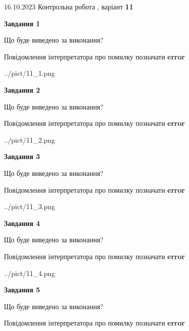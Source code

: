 \documentclass[12pt, ukrainian]{article}
\begin{document}
{\Large{16.10.2023 Контрольна робота , варіант  \No \textbf { 11 }\par}}
{
\begin {large}
{\begin {center}\textbf{Завдання 1}\end {center}}\par
Що буде виведено за виконання? \par
Повідомлення інтерпретатора про помилку позначати \textbf{error}

\begin{center}
	{../pict/11_1.png}
\end{center}
\newpage

{\begin {center}\textbf{Завдання 2}\end {center}}\par
Що буде виведено за виконання? \par
Повідомлення інтерпретатора про помилку позначати \textbf{error}

\begin{center}
	{../pict/11_2.png}
\end{center}
\newpage

{\begin {center}\textbf{Завдання 3}\end {center}}\par
Що буде виведено за виконання? \par
Повідомлення інтерпретатора про помилку позначати \textbf{error}

\begin{center}
	{../pict/11_3.png}
\end{center}
\newpage

{\begin {center}\textbf{Завдання 4}\end {center}}\par
Що буде виведено за виконання? \par
Повідомлення інтерпретатора про помилку позначати \textbf{error}

\begin{center}
	{../pict/11_4.png}
\end{center}
\newpage

{\begin {center}\textbf{Завдання 5}\end {center}}\par
Що буде виведено за виконання? \par
Повідомлення інтерпретатора про помилку позначати \textbf{error}


\end{large}}
\end{document}
